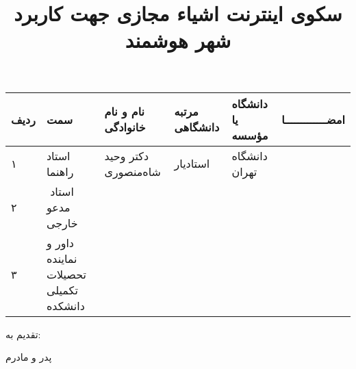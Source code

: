 \subject{مهندسی برق}

\title{سكوی اینترنت اشیاء مجازی جهت كاربرد شهر هوشمند}

\blankpage
\firstPage
\blankpage
\besmPage
\blankpage
\firstPage
\blankpage
\davaranPage
\leavevmode\thispagestyle{empty}
\begin{center}
\begin{tabular}{| p{8mm} | p{35mm} | p{} |p{14mm}|p{}|c|}
\hline
ردیف	  & سمت                                   & نام و نام خانوادگی    & مرتبه \newline دانشگاهی &	دانشگاه یا مؤسسه   &	امضـــــــــــــا \\
\hline
۱       & استاد راهنما                          & دکتر وحید شاه‌منصوری   & استاد‌یار                & دانشگاه تهران      &                    \\
\hline
۲       &‌ استاد مدعو خارجی			                 &                       &                         &                    &                    \\
\hline
۳       & داور و نماینده تحصیلات تکمیلی دانشکده	 &                       &                         &                    &                    \\
\hline
\end{tabular}
\end{center}
\esalatPage
\blankpage
\newpage\clearpage


\thispagestyle{empty}
{\Large تقدیم به:}\\
\begin{flushleft}
{\huge
پدر و مادرم
}
\end{flushleft}

